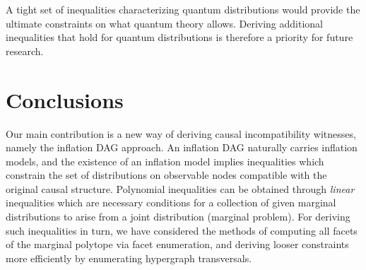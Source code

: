 
A tight set of inequalities characterizing quantum distributions would provide the ultimate constraints on what quantum theory allows. Deriving additional inequalities that hold for quantum distributions is therefore a priority for future research.








\section{Conclusions}

Our main contribution is a new way of deriving causal incompatibility witnesses, namely the inflation DAG approach. An inflation DAG naturally carries inflation models, and the existence of an inflation model implies inequalities which constrain the set of distributions on observable nodes compatible with the original causal structure. Polynomial inequalities can be obtained through \emph{linear} inequalities which are necessary conditions for a collection of given marginal distributions to arise from a joint distribution (marginal problem). For deriving such inequalities in turn, we have considered the methods of computing all facets of the marginal polytope via facet enumeration, and deriving looser constraints more efficiently by enumerating hypergraph transversals.

